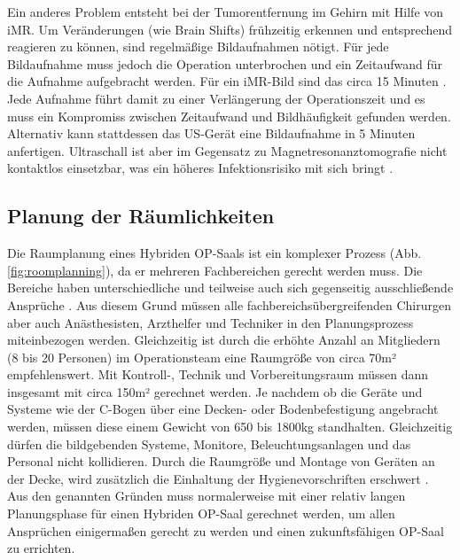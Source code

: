 Ein anderes Problem entsteht bei der Tumorentfernung im Gehirn mit Hilfe von iMR. Um Veränderungen (wie Brain Shifts) frühzeitig erkennen und entsprechend reagieren zu können, sind regelmäßige Bildaufnahmen nötigt. Für jede Bildaufnahme muss jedoch die Operation unterbrochen und ein Zeitaufwand für die Aufnahme aufgebracht werden. Für ein iMR-Bild sind das circa 15 Minuten \cite{BrainShiftInTumorResection}. Jede Aufnahme führt damit zu einer Verlängerung der Operationszeit und es muss ein Kompromiss zwischen Zeitaufwand und Bildhäufigkeit gefunden werden.\\
Alternativ kann stattdessen das US-Gerät eine Bildaufnahme in 5 Minuten anfertigen. Ultraschall ist aber im Gegensatz zu Magnetresonanztomografie nicht kontaktlos einsetzbar, was ein höheres Infektionsrisiko mit sich bringt \cite{BrainShiftInTumorResection}.

\subsection{Planung der Räumlichkeiten}

Die Raumplanung eines Hybriden OP-Saals ist ein komplexer Prozess (Abb. \ref{fig:roomplanning}), da er mehreren Fachbereichen gerecht werden muss. Die Bereiche haben unterschiedliche und teilweise auch sich gegenseitig ausschließende Ansprüche \cite{TechnicalConsiderations}. Aus diesem Grund müssen alle fachbereichsübergreifenden Chirurgen aber auch Anästhesisten, Arzthelfer und Techniker in den Planungsprozess miteinbezogen werden.
Gleichzeitig ist durch die erhöhte Anzahl an Mitgliedern (8 bis 20 Personen) im Operationsteam eine Raumgröße von circa 70m² empfehlenswert. Mit Kontroll-, Technik und Vorbereitungsraum müssen dann insgesamt mit circa 150m² gerechnet werden. Je nachdem ob die Geräte und Systeme wie der C-Bogen über eine Decken- oder Bodenbefestigung angebracht werden, müssen diese einem Gewicht von 650 bis 1800kg standhalten. Gleichzeitig dürfen die bildgebenden Systeme, Monitore, Beleuchtungsanlagen und das Personal nicht kollidieren. Durch die Raumgröße und Montage von Geräten an der Decke, wird zusätzlich die Einhaltung der Hygienevorschriften erschwert \cite{TechnicalConsiderations}.\\ 
Aus den genannten Gründen muss normalerweise mit einer relativ langen Planungsphase für einen Hybriden OP-Saal gerechnet werden, um allen Ansprüchen einigermaßen gerecht zu werden und einen zukunftsfähigen OP-Saal zu errichten.

